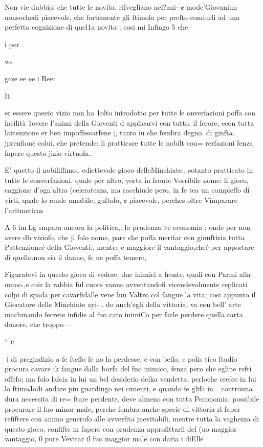 \documentclass[11pt,a6paper]{article}
\begin{document}
Non vie dubbio, che tutte
le novita. rifvegliano nel?ani- ¢
mode’Giovaniun nonsochedi 
piacevole, che fortemente gli
ftimola per prefto condurli ad
una perfetta cognizione di quel1a novita ; cosi mi Infingo 5 che

i per

ws

gcse ee ee i Ree:
 

It

er essere questo vizio non ha
1olto introdotto per tutte le
onverfazioni poffa con facilità
1overe l’animi della Gioventi
d applicarvi con tutto. il ferore, econ tutta lattenzione
er ben impoffessarfene ;, tanto
iu che fembra degno. di ginfta.
jprenfione colui, che pretende:
li pratticare tutte le nobilt con=
rerfazioni fenza fapere questo
jizio virtuofa..

E’ quetto il nobiliffimo., ediettevole gioco delleMinchiate,,
sotanto pratticato in tutte le
converfazioni, quale per altro,
yorta in fronte Vorribile nome:
li gioco, caggione d’ogn’altra
(celeratezza, ma racchiude pero. in fe tea un compleffo di
virti, quale lo rende amabile,
guftofo, ¢ piacevole, perches
oltre Vimparare l’aritmeticas

A 6 imLg
smpara ancora la politica,. la
prudenza »e economia ; onde
per non avere db viziofo, che jl
folo nome, pare che poffa meritar con ginuftizia tutta Pattenzioneé della Gioventi:, mentre
e maggiore il vantaggio,cheé
per apportare di quello.non sia
il danno, fe ne poffa temere,

Figuratevi in questo gioco di
vedere. due inimici a fronte,
quali con Parmi alla mano.,e
coir la rabbia ful cuore vanno
avventandofi vicendevolmente
replicati colpi di spada per cavarfidalle vene lun Valtro col
fangue la vita; cosi appunto il
Giocatore delle Minchiate ayi- .
do anch’egli della vittoria, va
eon bell’ arte machinando fecrete infidie al fuo caro inimiCo per farle perdere quella carta donore, che troppo —

“ i:

 
i
di pregindizio a fe fteffo fe no
la perdesse, e con bello, e polis
tico ftudio procura cavare ik
fangue dalla borfa del fuo inimico, fenza pero che egline
refti offefo; ma folo lafcia in lui
un bel desiderio delka vendetta,
perloche crefce in lui lo ftimoJodi andare piu guardingo nei
cimenti, e quando fe glifa in=
controuna dura necessita di re=
ftare perdente, deve almeno
con tutta Peconomia: possibile
procurare il fuo minor male,
perche fembra anche specie di
vittoria rl faper refiftere con
animo generofo alle avverfita
jnevitabili, mentre tutta la vaghezza di questo gioco, confifte
in fapere con prudenza approfittarfi del (uo maggior vantaggio, 0 pure Vevitar il fuo maggior male con daria i diElle
 
\end{document}
